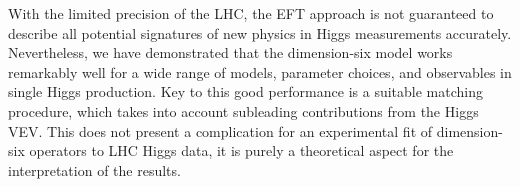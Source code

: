 With the limited precision of the LHC, the EFT approach is not
guaranteed to describe all potential signatures of new physics in
Higgs measurements accurately. Nevertheless, we have demonstrated that
the dimension-six model works remarkably well for a wide range of
models, parameter choices, and observables in single Higgs
production. Key to this good performance is a suitable matching
procedure, which takes into account subleading contributions from the
Higgs VEV. This does not present a complication for an experimental
fit of dimension-six operators to LHC Higgs data, it is purely a
theoretical aspect for the interpretation of the results.
